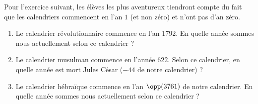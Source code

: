
\begin{exercice}\label{exo2smath-0042}

    Pour l'exercice suivant, les élèves les plus aventureux tiendront compte du fait que les calendriers commencent en l'an \( 1\) (et non zéro) et n'ont pas d'an zéro.
    \begin{enumerate}
        \item
            Le calendrier révolutionnaire commence en l'an \( 1792\). En quelle année sommes nous actuellement selon ce calendrier ?
        \item
            Le calendrier musulman commence en l'année \( 622\). Selon ce calendrier, en quelle année est mort Jules César (\( -44\) de notre calendrier) ?
        \item
            Le calendrier hébraïque commence en l'an \( \opp(3761)\) de notre calendrier. En quelle année sommes nous actuellement selon ce calendrier ?
    \end{enumerate}

\end{exercice}
